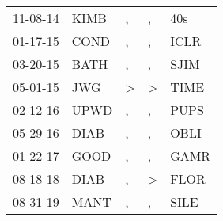 \begin{supertabular}{lllll}
 11-08-14 &  KIMB &             , &             , &   40s \\
 01-17-15 &  COND &             , &             , &  ICLR \\
 03-20-15 &  BATH &             , &             , &  SJIM \\
 05-01-15 &   JWG &  \textgreater &  \textgreater &  TIME \\
 02-12-16 &  UPWD &             , &             , &  PUPS \\
 05-29-16 &  DIAB &             , &             , &  OBLI \\
 01-22-17 &  GOOD &             , &             , &  GAMR \\
 08-18-18 &  DIAB &             , &  \textgreater &  FLOR \\
 08-31-19 &  MANT &             , &             , &  SILE \\
\end{supertabular}
